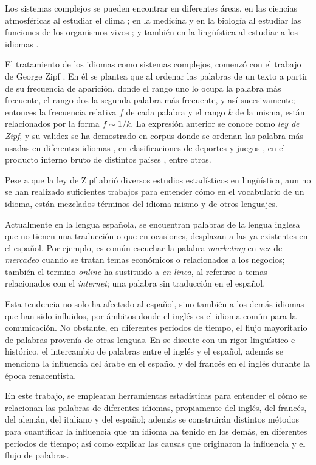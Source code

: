 Los sistemas complejos se pueden encontrar en diferentes áreas, en las ciencias atmosféricas al estudiar el clima \cite{complex_climate};  en la medicina y en la biología al estudiar las funciones de los organismos vivos  \cite{complex_medicine}; y también en la lingüística al estudiar a los idiomas  \cite{complex_language} .

El tratamiento de los idiomas como sistemas complejos, comenzó con el trabajo de George Zipf \cite{zipf}. En él se plantea que al ordenar las palabras de un texto a partir de su frecuencia de aparición, donde el rango uno lo ocupa la palabra más frecuente, el rango dos la segunda palabra más frecuente, y así sucesivamente; entonces la frecuencia relativa $f$ de cada palabra y el rango $k$ de la misma, están relacionados por la forma $f\sim1/k$. La expresión anterior se conoce como \textit{ley de Zipf}, y su validez se ha demostrado en corpus donde se ordenan las palabra más usadas en diferentes idiomas \cite{tesis.sergio}, en clasificaciones de deportes y juegos \cite{epj}, en el producto interno bruto de distintos países \cite{zipf_gdp}, entre otros. 

Pese a que la ley de Zipf abrió diversos estudios estadísticos en lingüística, aun no se han realizado suficientes trabajos para entender cómo en el vocabulario de un idioma, están mezclados términos del idioma mismo y de otros lenguajes. 

Actualmente en la lengua española, se encuentran palabras de la lengua inglesa que no tienen una traducción o que en ocasiones, desplazan a las ya existentes en el español. Por ejemplo, es común escuchar la palabra \textit{marketing} en vez de \textit{mercadeo} cuando se tratan temas económicos o relacionados a los negocios; también el termino \textit{online} ha sustituido a \textit{en linea}, al referirse a temas relacionados con el \textit{internet}; una palabra sin traducción en el español. 

Esta tendencia no solo ha afectado al español, sino también a los demás idiomas que han sido influidos, por ámbitos donde el inglés es el idioma común para la comunicación.  No obstante,  en diferentes periodos de tiempo, el flujo mayoritario de palabras provenía de otras lenguas. En \cite{influencia_mutua} se discute con un rigor lingüístico e histórico, 
el intercambio de palabras entre el inglés y el español, además se menciona la influencia del árabe en el español y del francés en el inglés durante la época renacentista.  

En este trabajo, se emplearan herramientas estadísticas para entender el cómo se relacionan las palabras de diferentes idiomas, propiamente del inglés, del francés, del alemán, del italiano y del español;  además se construirán distintos métodos para cuantificar la influencia que un idioma ha tenido en los demás, en diferentes periodos de tiempo; así como explicar las causas que originaron la influencia y el flujo de palabras. 




